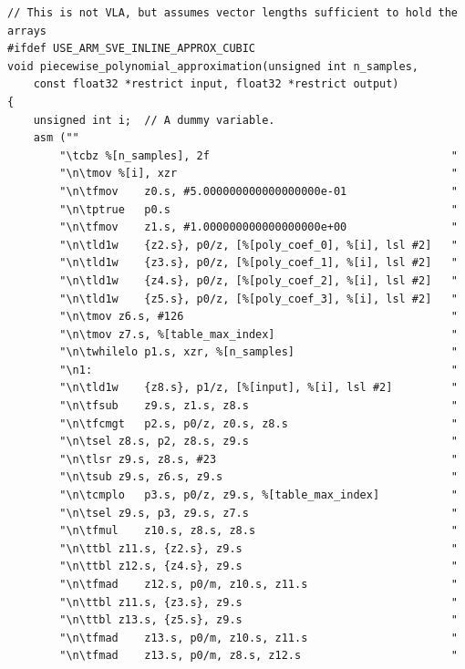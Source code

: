 \documentclass[11pt,a4paper,oneside,english]{extarticle}
\begin{document}
\begin{lstfloat}[h!tb]
\begin{lstlisting}[style=C, captionpos=b, caption={Piecewise polynomial approximation implementations using \arm SVE inline assembly.}, label={code:c:piecewise_polynomial_approximation_use_arm_sve_inline_approx_cubic}]
// This is not VLA, but assumes vector lengths sufficient to hold the arrays
#ifdef USE_ARM_SVE_INLINE_APPROX_CUBIC
void piecewise_polynomial_approximation(unsigned int n_samples, 
    const float32 *restrict input, float32 *restrict output)
{
    unsigned int i;  // A dummy variable.
    asm (""
        "\tcbz %[n_samples], 2f                                     "  
        "\n\tmov %[i], xzr                                          "
        "\n\tfmov    z0.s, #5.000000000000000000e-01                "
        "\n\tptrue   p0.s                                           "
        "\n\tfmov    z1.s, #1.000000000000000000e+00                "
        "\n\tld1w    {z2.s}, p0/z, [%[poly_coef_0], %[i], lsl #2]   "
        "\n\tld1w    {z3.s}, p0/z, [%[poly_coef_1], %[i], lsl #2]   "
        "\n\tld1w    {z4.s}, p0/z, [%[poly_coef_2], %[i], lsl #2]   "
        "\n\tld1w    {z5.s}, p0/z, [%[poly_coef_3], %[i], lsl #2]   "
        "\n\tmov z6.s, #126                                         "
        "\n\tmov z7.s, %[table_max_index]                           "
        "\n\twhilelo p1.s, xzr, %[n_samples]                        "
        "\n1:                                                       "
        "\n\tld1w    {z8.s}, p1/z, [%[input], %[i], lsl #2]         "
        "\n\tfsub    z9.s, z1.s, z8.s                               "
        "\n\tfcmgt   p2.s, p0/z, z0.s, z8.s                         "
        "\n\tsel z8.s, p2, z8.s, z9.s                               "
        "\n\tlsr z9.s, z8.s, #23                                    "
        "\n\tsub z9.s, z6.s, z9.s                                   "
        "\n\tcmplo   p3.s, p0/z, z9.s, %[table_max_index]           "
        "\n\tsel z9.s, p3, z9.s, z7.s                               "
        "\n\tfmul    z10.s, z8.s, z8.s                              "
        "\n\ttbl z11.s, {z2.s}, z9.s                                "
        "\n\ttbl z12.s, {z4.s}, z9.s                                "
        "\n\tfmad    z12.s, p0/m, z10.s, z11.s                      "
        "\n\ttbl z11.s, {z3.s}, z9.s                                "
        "\n\ttbl z13.s, {z5.s}, z9.s                                "
        "\n\tfmad    z13.s, p0/m, z10.s, z11.s                      "
        "\n\tfmad    z13.s, p0/m, z8.s, z12.s                       "

\end{lstlisting}
\end{lstfloat}
\end{document}
